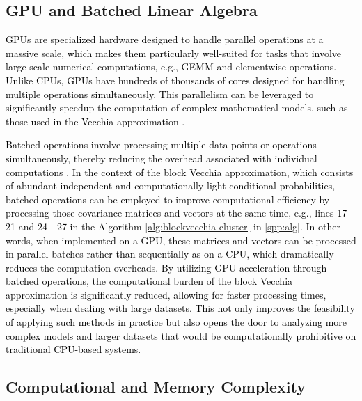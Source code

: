 \documentclass[12pt]{article}
\begin{document}
\subsection{GPU and Batched Linear Algebra}

\textcolor{black}{
    GPUs are specialized hardware designed to handle parallel operations at a massive scale, which makes them particularly well-suited for tasks that involve large-scale numerical computations, e.g., GEMM and elementwise operations. Unlike CPUs, GPUs have hundreds of thousands of cores designed for handling multiple operations simultaneously. This parallelism can be leveraged to significantly speedup the computation of complex mathematical models, such as those used in the Vecchia approximation \citep{pan2024gpuaccelerated}.} 

\textcolor{black}{   
    Batched operations involve processing multiple data points or operations simultaneously, thereby reducing the overhead associated with individual computations \citep{haidar2015batched}. In the context of the block Vecchia approximation, which consists of abundant independent and computationally light conditional probabilities, batched operations can be employed to improve computational efficiency by processing those covariance matrices and vectors at the same time, e.g., lines 17 - 21 and 24 - 27 in the Algorithm \ref{alg:blockvecchia-cluster} in \ref{spp:alg}. In other words, when implemented on a GPU, these matrices and vectors can be processed in parallel batches rather than sequentially as on a CPU, which dramatically reduces the computation overheads. By utilizing GPU acceleration through batched operations, the computational burden of the block Vecchia approximation is significantly reduced, allowing for faster processing times, especially when dealing with large datasets. This not only improves the feasibility of applying such methods in practice but also opens the door to analyzing more complex models and larger datasets that would be computationally prohibitive on traditional CPU-based systems.
}

\subsection{Computational and Memory Complexity} %
\end{document}
